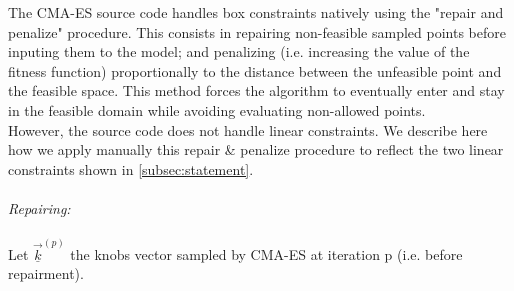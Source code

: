 The CMA-ES source code handles box constraints natively using the "repair and penalize" procedure. This consists in repairing non-feasible sampled points before inputing them to the model; and penalizing (i.e. increasing the value of the fitness function) proportionally to the distance between the unfeasible point and the feasible space. This method forces the algorithm to eventually enter and stay in the feasible domain while avoiding evaluating non-allowed points.\\
However, the source code does not handle linear constraints. We describe here how we apply manually this repair \& penalize procedure to reflect the two linear constraints shown in \ref{subsec:statement}.\\
\\
%
\emph{Repairing:}\\
\\
Let $\underline{\vec{k}}^{(p)}$ the knobs vector sampled by CMA-ES at iteration p (i.e. before repairment).\\
